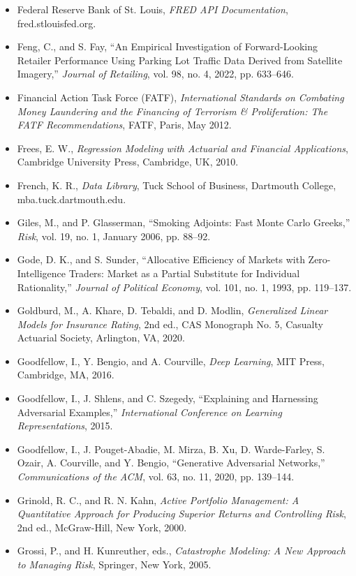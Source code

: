 \documentclass{book}
\begin{document}
\begin{itemize}
    \item Federal Reserve Bank of St. Louis, \emph{FRED API Documentation}, fred.stlouisfed.org.
    \item Feng, C., and S. Fay, ``An Empirical Investigation of Forward-Looking Retailer Performance Using Parking Lot Traffic Data Derived from Satellite Imagery,'' \emph{Journal of Retailing}, vol. 98, no. 4, 2022, pp. 633--646.
    \item Financial Action Task Force (FATF), \emph{International Standards on Combating Money Laundering and the Financing of Terrorism \& Proliferation: The FATF Recommendations}, FATF, Paris, May 2012.
    \item Frees, E. W., \emph{Regression Modeling with Actuarial and Financial Applications}, Cambridge University Press, Cambridge, UK, 2010.
    \item French, K. R., \emph{Data Library}, Tuck School of Business, Dartmouth College, mba.tuck.dartmouth.edu.
    \item Giles, M., and P. Glasserman, ``Smoking Adjoints: Fast Monte Carlo Greeks,'' \emph{Risk}, vol. 19, no. 1, January 2006, pp. 88--92.
    \item Gode, D. K., and S. Sunder, ``Allocative Efficiency of Markets with Zero-Intelligence Traders: Market as a Partial Substitute for Individual Rationality,'' \emph{Journal of Political Economy}, vol. 101, no. 1, 1993, pp. 119--137.
    \item Goldburd, M., A. Khare, D. Tebaldi, and D. Modlin, \emph{Generalized Linear Models for Insurance Rating}, 2nd ed., CAS Monograph No. 5, Casualty Actuarial Society, Arlington, VA, 2020.
    \item Goodfellow, I., Y. Bengio, and A. Courville, \emph{Deep Learning}, MIT Press, Cambridge, MA, 2016.
    \item Goodfellow, I., J. Shlens, and C. Szegedy, ``Explaining and Harnessing Adversarial Examples,'' \emph{International Conference on Learning Representations}, 2015.
    \item Goodfellow, I., J. Pouget-Abadie, M. Mirza, B. Xu, D. Warde-Farley, S. Ozair, A. Courville, and Y. Bengio, ``Generative Adversarial Networks,'' \emph{Communications of the ACM}, vol. 63, no. 11, 2020, pp. 139--144.
    \item Grinold, R. C., and R. N. Kahn, \emph{Active Portfolio Management: A Quantitative Approach for Producing Superior Returns and Controlling Risk}, 2nd ed., McGraw-Hill, New York, 2000.
    \item Grossi, P., and H. Kunreuther, eds., \emph{Catastrophe Modeling: A New Approach to Managing Risk}, Springer, New York, 2005.

\end{itemize}
\end{document}
